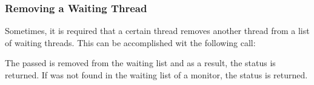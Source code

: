 \subsubsection{Removing a Waiting Thread}

Sometimes, it is required that a certain thread removes another thread from
a list of waiting threads. This can be accomplished wit the following call:


The passed  is removed from the waiting list and as a result,
the status  is returned. If  was not
found in the waiting list of a monitor, the status 
is returned.


